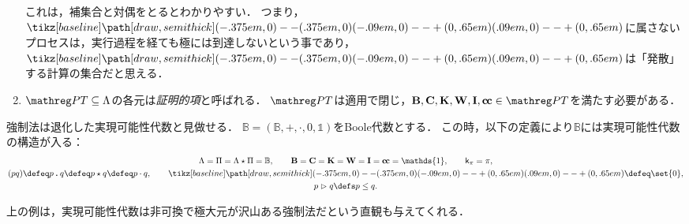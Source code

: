 \documentclass[realisability.tex]{subfiles}
\begin{document}
\begin{definition}
\begin{enumerate}
        これは，補集合と対偶をとるとわかりやすい．
        つまり，$\pole$に属さないプロセスは，実行過程を経ても極には到達しないという事であり，$\pole$は「発散」する計算の集合だと思える．
  \item $\PT \subseteq \Lambda$の各元は\emph{証明的項}と呼ばれる．
        $\PT$は適用で閉じ，$\B, \C, \K, \W, \I, \cc \in \PT$を満たす必要がある．
 \end{enumerate}
\end{definition}

\begin{example}[実現可能性代数としての強制法]
 強制法は退化した実現可能性代数と見做せる．
 $\mathbb{B} = (\mathbb{B}, {+}, {\cdot}, 0, \mathds{1})$をBoole代数とする\footnotemark．
 この時，以下の定義により$\mathbb{B}$には実現可能性代数の構造が入る：
 \begin{gather*}
  \Lambda = \Pi = \Lambda \cons \Pi = \mathbb{B}, \qquad
  \B = \C = \K = \W = \I = \cc = \mathds{1},\qquad \conti_\pi = \pi,\\
  (p q) \defeq p \push q \defeq p \cons q \defeq p \cdot q, \qquad
  \pole \defeq \set{0},\\
  p \reds q \defs p \leq q.
 \end{gather*}
\end{example}
上の例は，実現可能性代数は非可換で極大元が沢山ある強制法だという直観も与えてくれる．
\end{document}
